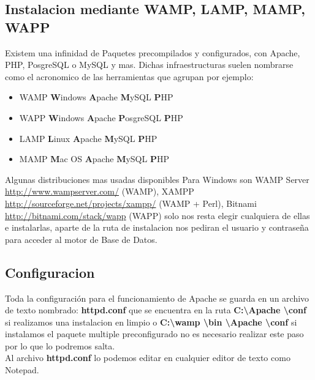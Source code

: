 \subsection{Instalacion mediante WAMP, LAMP, MAMP, WAPP}

Existem una infinidad de Paquetes precompilados y configurados, con Apache, PHP, PosgreSQL o MySQL y mas.
Dichas infraestructuras suelen nombrarse como el acronomico de las herramientas que agrupan por ejemplo:\\[1cm]

\begin{itemize}
    \item {\large WAMP {\bfseries W}indows {\bfseries A}pache {\bfseries M}ySQL {\bfseries P}HP}
    \item {\large WAPP  {\bfseries W}indows {\bfseries A}pache {\bfseries P}osgreSQL {\bfseries P}HP}  
    \item {\large LAMP {\bfseries L}inux {\bfseries A}pache {\bfseries M}ySQL {\bfseries P}HP} 
    \item {\large MAMP {\bfseries M}ac OS {\bfseries A}pache {\bfseries M}ySQL {\bfseries P}HP}  
\end{itemize}


Algunas distribuciones mas usadas disponibles Para Windows son WAMP Server \url{http://www.wampserver.com/} (WAMP),
XAMPP \url{http://sourceforge.net/projects/xampp/} (WAMP + Perl), Bitnami \url{http://bitnami.com/stack/wapp} (WAPP)
solo nos resta elegir cualquiera de ellas e instalarlas, aparte de la ruta de instalacion nos pediran el usuario y
contraseña para acceder al motor de Base de Datos.

\subsection{Configuracion}

Toda la configuración para el funcionamiento de Apache se guarda en un archivo
de texto nombrado: {\bfseries httpd.conf} que se encuentra en la ruta
{\bfseries C:\textbackslash Apache \textbackslash conf } si realizamos una instalacion en limpio o
{\bfseries C:\textbackslash wamp \textbackslash bin \textbackslash  Apache \textbackslash conf } si
instalamos el paquete multiple preconfigurado no es necesario realizar este paso por lo
que lo podremos salta.\\

Al archivo {\bfseries httpd.conf} lo podemos editar en cualquier editor de texto como Notepad.

